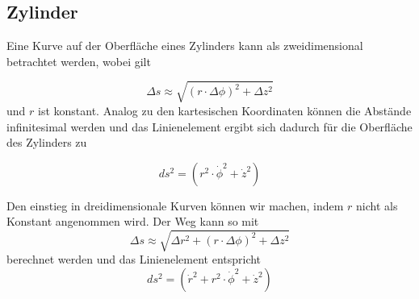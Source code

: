 %
%
%
%
\subsection{Zylinder\label{geodaeten:section:Linienelemente:Zylinder}}

Eine Kurve auf der Oberfläche eines Zylinders kann als zweidimensional betrachtet werden, wobei gilt

\begin{equation}
	\Delta s \approx \sqrt{(r \cdot \Delta \phi)^2 + \Delta z^2}
\end{equation}
und $r$ ist konstant.
Analog zu den kartesischen Koordinaten können die Abstände infinitesimal werden und das Linienelement ergibt sich dadurch für die Oberfläche des Zylinders zu

\begin{equation}
	ds^2 = \left(r^2 \cdot \dot{\phi}^2 +\dot{z}^2\right) %
	\label{geodaeten:equation:Linienelemente:Zylinder:equation2}
\end{equation}

%

Den einstieg in dreidimensionale Kurven können wir machen, indem $r$ nicht als Konstant angenommen wird.
Der Weg kann so mit
\begin{equation}
	\Delta s \approx \sqrt{\Delta r^2 + (r \cdot \Delta \phi)^2 + \Delta z^2} %
\end{equation}
berechnet werden und das Linienelement entspricht 
\begin{equation}
	ds^2 = \left( \dot{r}^2 + r^2 \cdot \dot{\phi}^2 +\dot{z}^2 \right) %
	\label{geodaeten:equation:Linienelemente:Zylinder:Zylinder3D}
\end{equation}

